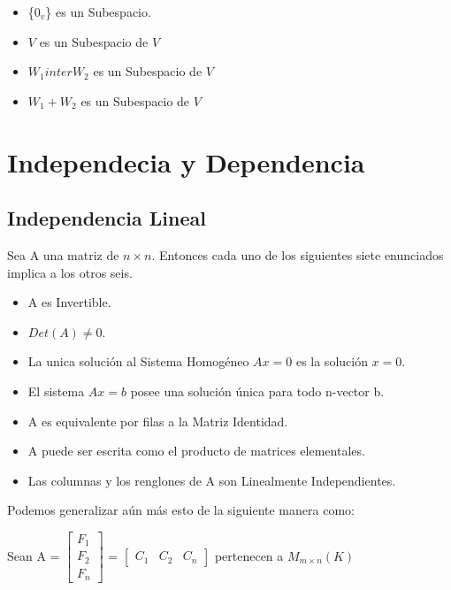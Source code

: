 \documentclass[12pt]{report}							    %
\begin{document}
        \begin{itemize}
            \item \{$0_v$\} es un Subespacio.

            \item $V$ es un Subespacio de $V$

            \item $W_1 inter W_2$ es un Subespacio de $V$

            \item $W_1 + W_2$ es un Subespacio de $V$
        \end{itemize}


    \clearpage
    \section{Independecia y Dependencia}   

        \subsection{Independencia Lineal}
        Sea A una matriz de $n \times n$. Entonces cada uno de los siguientes siete enunciados implica a los otros seis.
        \begin{itemize}
            \item A es Invertible.
            \item $Det(A) \neq 0$.
            \item La unica solución al Sistema Homogéneo $Ax=0$ es la solución $x=0$.
            \item El sistema $Ax=b$ posee una solución única para todo n-vector b.
            \item A es equivalente por filas a la Matriz Identidad.
            \item A puede ser escrita como el producto de matrices elementales.
            \item Las columnas y los renglones de A son Linealmente Independientes.
        \end{itemize}

        Podemos generalizar aún más esto de la siguiente manera como: 

        Sean A  = $\begin{bmatrix} F_{1} \\ F_{2} \\ F_{n} \end{bmatrix} $ 
                = $\begin{bmatrix} C_{1} &  C_{2} &  C_{n} \end{bmatrix} $
                pertenecen a $M_{m\times n} (K)$
\end{document}
